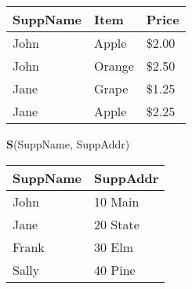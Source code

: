 \documentclass{report}
\begin{document}
\begin{itemize}
\begin{center}
\begin{tabular}{|l|l|l|}
                    \textbf{SuppName} & \textbf{Item} & \textbf{Price} \\ \hline
                    John    & Apple   & \$2.00  \\ \hline
                    John    & Orange  & \$2.50  \\ \hline
                    Jane    & Grape   & \$1.25  \\ \hline
                    Jane    & Apple   & \$2.25  \\ \hline
                \end{tabular}
            \end{center}
            \bigbreak \noindent 
            \textbf{S}(SuppName, SuppAddr)
            \bigbreak \noindent 
            \begin{center}
                \begin{tabular}{|l|l|}
                    \hline
                    \textbf{SuppName} & \textbf{SuppAddr} \\ \hline
                    John    & 10 Main   \\ \hline
                    Jane    & 20 State  \\ \hline
                    Frank   & 30 Elm    \\ \hline
                    Sally   & 40 Pine   \\ \hline
                \end{tabular}


\end{center}
\end{itemize}
\end{document}
